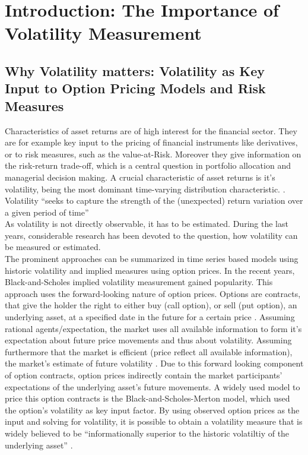 
\section{Introduction: The Importance of Volatility Measurement}

\subsection{Why Volatility matters: Volatility as Key Input to Option Pricing Models and Risk Measures}
Characteristics of asset returns are of high interest for the financial sector. They are for example key input to the pricing of financial instruments like derivatives, or to risk measures, such as the value-at-Risk. Moreover they give information on the risk-return trade-off, which is a central question in portfolio allocation and managerial decision making. A crucial characteristic of asset returns is it's volatility, being the most dominant time-varying distribution characteristic. \parencite{andersen2018}.\\
Volatility ``seeks to capture the strength of the (unexpected) return variation over a given period of time'' \parencite[p.7]{andersen2001}\\
As volatility is not directly observable, it has to be estimated. During the last years, considerable research has been devoted to the question, how volatility can be measured or estimated.\\
The prominent approaches can be summarized in time series based models using historic volatility and implied measures using option prices. In the recent years, Black-and-Scholes implied volatility measurement gained popularity. This approach uses the forward-looking nature of option prices. Options are contracts, that give the holder the right to either buy (call option), or sell (put option), an underlying asset, at a specified date in the future for a certain price \parencite{hull2006}. Assuming rational agents/expectation, the market uses all available information to form it's expectation about future price movements and thus about volatility. Assuming furthermore that the market is efficient (price reflect all available information), the market's estimate of future volatility  \parencite{christensen2002}. Due to this forward looking component of option contracts, option prices indirectly contain the market participants' expectations of the underlying asset's future movements. A widely used model to price this option contracts is the Black-and-Scholes-Merton model, which used the option's volatility as key input factor. By using observed option prices as the input and solving for volatility, it is possible to obtain a volatility measure that is widely believed to be ``informationally superior to the historic volatiltiy of the underlying asset'' \parencite[p.1305]{jiang2003}.\\
